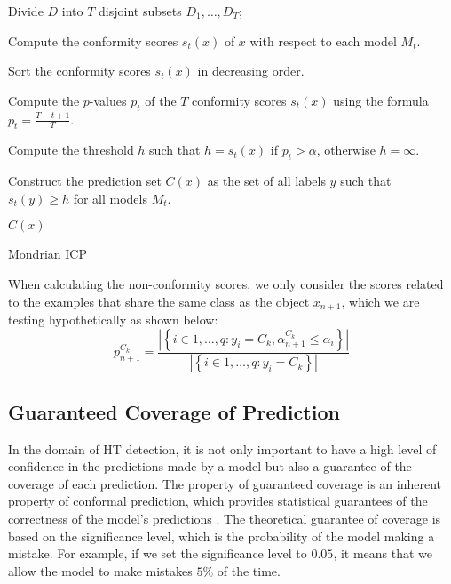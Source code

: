 \documentclass[9pt,conference]{IEEEtran}
\begin{document}
\begin{algorithm}[t]
Divide $D$ into $T$ disjoint subsets $D_1, \ldots, D_T$;

Compute the conformity scores $s_t(x)$ of $x$ with respect to each model $M_t$.

Sort the conformity scores $s_t(x)$ in decreasing order.

Compute the $p$-values $p_t$ of the $T$ conformity scores $s_t(x)$ using the formula $p_t = \frac{T - t + 1}{T}$.

Compute the threshold $h$ such that $h = s_t(x)$ if $p_t > \alpha$, otherwise $h = \infty$.

Construct the prediction set $C(x)$ as the set of all labels $y$ such that $s_t(y) \geq h$ for all models $M_t$.

\Return $C(x)$
\caption{Mondrian ICP}
\label{algo:mcp}
\end{algorithm}

When calculating the non-conformity scores, we only consider the scores related to the examples that share the same class as the object $x_{n+1}$, which we are testing hypothetically as shown below: 
$$
p_{n+1}^{C_k}=\frac{\left|\left\{i \in 1, \ldots, q: y_i=C_k, \alpha_{n+1}^{C_k} \leq \alpha_i\right\}\right|}{\left|\left\{i \in 1, \ldots, q: y_i=C_k\right\}\right|}
$$


\subsection{Guaranteed Coverage of Prediction}
\label{sec:Coverage}
In the domain of HT detection, it is not only important to have a high level of confidence in the predictions made by a model but also a guarantee of the coverage of each prediction. The property of guaranteed coverage is an inherent property of conformal prediction, which provides statistical guarantees of the correctness of the model's predictions \cite{angelopoulos2023conformal}. The theoretical guarantee of coverage is based on the significance level, which is the probability of the model making a mistake. For example, if we set the significance level to $0.05$, it means that we allow the model to make mistakes $5\%$ of the time.
\end{document}
